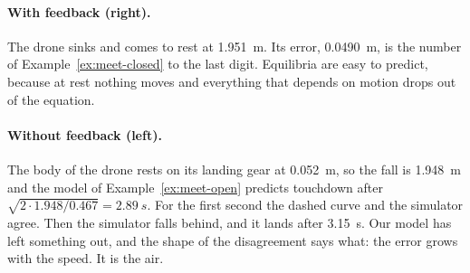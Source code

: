\paragraph{With feedback (right).} The drone sinks and comes to rest at \SI{1.951}{m}. Its error, \SI{0.0490}{m}, is the number of Example~\ref{ex:meet-closed} to the last digit. Equilibria are easy to predict, because at rest nothing moves and everything that depends on motion drops out of the equation.

\paragraph{Without feedback (left).} The body of the drone rests on its landing gear at \SI{0.052}{m}, so the fall is \SI{1.948}{m} and the model of Example~\ref{ex:meet-open} predicts touchdown after $\sqrt{2 \cdot 1.948/0.467} = \SI{2.89}{s}$. For the first second the dashed curve and the simulator agree. Then the simulator falls behind, and it lands after \SI{3.15}{s}. Our model has left something out, and the shape of the disagreement says what: the error grows with the speed. It is the air.


